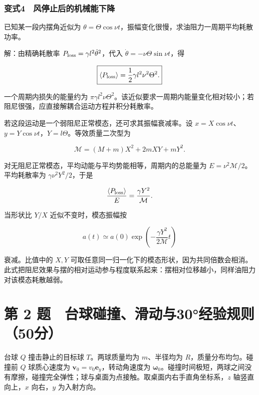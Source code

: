 \documentclass[12pt,a4paper,fontset=fandol]{ctexart}
\begin{document}
\noindent\begin{minipage}{\linewidth}
\subsubsection{变式4　风停止后的机械能下降}\label{ux53d8ux5f0f4-ux98ceux505cux6b62ux540eux7684ux673aux68b0ux80fdux4e0bux964d}

已知某一段内摆角近似为
\(\theta=\Theta\cos\nu t\)，振幅变化很慢，求油阻力一周期平均耗散功率。

解：由精确耗散率 \(P_{\rm loss}=\gamma l^2\dot\theta^2\)，代入
\(\dot\theta=-\nu\Theta\sin\nu t\)，得

\[\boxed{\langle P_{\rm loss}\rangle
=\frac12\gamma l^2\nu^2\Theta^2.}\]

一个周期内损失的能量约为
\(\pi\gamma l^2\nu\Theta^2\)。该近似要求一周期内能量变化相对较小；若阻尼很强，应直接解耦合运动方程并积分耗散率。

若这段运动是一个弱阻尼正常模态，还可求其振幅衰减率。设
\(x=X\cos\nu t\)、\(y=Y\cos\nu t\)，\(Y=l\Theta\)。等效质量二次型为

\[\mathcal M=(M+m)X^2+2mXY+mY^2.\]

对无阻尼正常模态，平均动能与平均势能相等，周期内的总能量为
\(E=\nu^2\mathcal M/2\)。平均耗散率为 \(\gamma\nu^2Y^2/2\)，于是

\[\frac{\langle P_{\rm loss}\rangle}{E}
=\frac{\gamma Y^2}{\mathcal M}.\]

当形状比 \(Y/X\) 近似不变时，模态振幅按

\[\boxed{a(t)\simeq a(0)\exp\left(-\frac{\gamma Y^2}{2\mathcal M}t\right)}\]

衰减。比值中的 \(X,Y\)
可取任意同一归一化下的模态形状，因为共同倍数会相消。此式把阻尼效果与摆的相对运动参与程度联系起来：摆相对位移越小，同样油阻力对该模态耗散越弱。


\end{minipage}

\clearpage

\section{第 2
题　台球碰撞、滑动与30°经验规则（50分）}\label{ux7b2c-2-ux9898-ux53f0ux7403ux78b0ux649eux6ed1ux52a8ux4e0e30ux7ecfux9a8cux89c4ux521950ux5206}

台球 \(Q\) 撞击静止的目标球 \(T\)。两球质量均为 \(m\)、半径均为
\(R\)，质量分布均匀。碰撞前 \(Q\) 球质心速度为
\(\boldsymbol v_0=v_0\boldsymbol e_y\)，转动角速度为
\(\boldsymbol\omega_0\)。碰撞时间极短，两球之间没有摩擦，碰撞完全弹性；球与桌面为点接触。取桌面内右手直角坐标系，\(z\)
轴竖直向上，\(x\) 向右，\(y\) 为入射方向。
\end{document}
